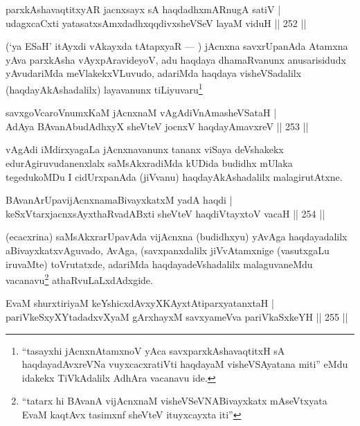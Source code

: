 \begin{shl}
parxkAshavaqtitxyAR jacnxsayx sA haqdadhxmARnugA satiV |\\
udagxcaCxti yatasatxsAmxdadhxqqdivxsheVSeV layaM viduH \hfill || 252 ||
\end{shl}

\begin{artha}
(`ya ESaH' itAyxdi vAkayxda tAtapxyaR  {\rm ---} ) jAcnxna savxrUpanAda Atamxna yAva parxkAsha vAyxpAravideyoV, adu haqdaya dhamaRvanunx anusarisidudx yAvudariMda meVlakekxVLuvudo, adariMda haqdaya visheVSadalilx (haqdayAkAshadalilx) layavanunx tiLiyuvaru\footnote{``tasayxhi jAcnxnAtamxnoV yAca savxparxkAshavaqtitxH sA haqdayadAvxreVNa vuyxcacxratiVti haqdayaM visheVSAyatana miti'' eMdu idakekx TiVkAdalilx AdhAra vacanavu ide.}
\end{artha}

\begin{shl}
savxgoVcaroVnumxKaM jAcnxnaM vAgAdiVnAmasheVSataH |\\
AdAya BAvanAbudAdhxyX sheVteV jocnxV haqdayAmavxreV \hfill || 253 ||
\end{shl}

\begin{artha}
vAgAdi iMdirxyagaLa jAcnxnavanunx tananx viSaya deVshakekx edurAgiruvudanenxlalx saMsAkxradiMda kUDida budidhx mUlaka tegedukoMDu I cidUrxpanAda (jiVvanu) haqdayAkAshadalilx malagirutAtxne.
\end{artha}

\begin{shl}
BAvanArUpavijAcnxnamaBivayxkatxM yadA haqdi |\\
keSxVtarxjacnxsAyxthaRvadABxti sheVteV haqdiVtayxtoV vacaH \hfill || 254 ||
\end{shl}

\begin{artha}
(ecacxrina) saMsAkxrarUpavAda vijAcnxna (budidhxyu) yAvAga haqdayadalilx aBivayxkatxvAguvado, AvAga, (savxpanxdalilx jiVvAtamxnige (vasutxgaLu iruvaMte) toVrutatxde, adariMda haqdayadeVshadalilx malaguvaneMdu vacanavu\footnote{``tatarx hi BAvanA vijAcnxnaM visheVSeVNABivayxkatx mAseVtxyata EvaM kaqtAvx tasimxnf sheVteV ituyxcayxta  iti''} athaRvuLaLxdAdxgide.
\end{artha}


\begin{shl}
EvaM shurxtiriyaM keYshicxdAvxyXKAyxtA\s tiparxyatanxtaH |\\
pariVkeSxyXYtadadxvXyaM gArxhayxM savxyameVva pariVkaSxkeYH \hfill || 255 ||
\end{shl}

